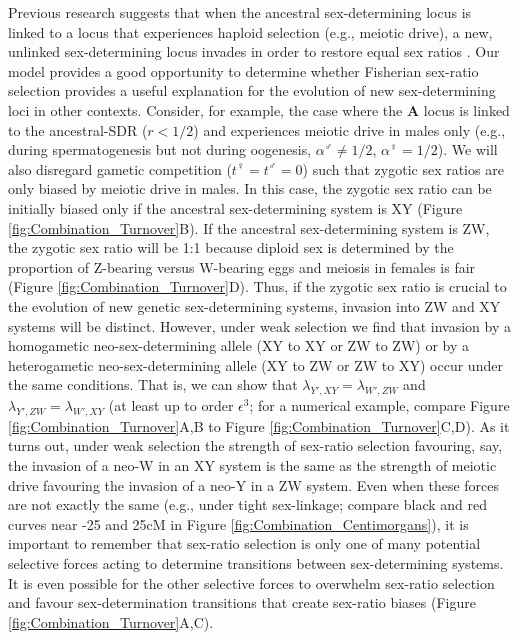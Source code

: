 \documentclass[12pt]{article}
\begin{document}
Previous research suggests that when the ancestral sex-determining locus is linked to a locus that experiences haploid selection (e.g., meiotic drive), a new, unlinked sex-determining locus invades in order to restore equal sex ratios \citep{Kozielska:2010vm}. 
Our model provides a good opportunity to determine whether Fisherian sex-ratio selection provides a useful explanation for the evolution of new sex-determining loci in other contexts. 
Consider, for example, the case where the \textbf{A} locus is linked to the ancestral-SDR ($r<1/2$) and experiences meiotic drive in males only (e.g., during spermatogenesis but not during oogenesis, $\alpha^\male \neq 1/2$, $\alpha^\female=1/2$). 
We will also disregard gametic competition ($t^\female=t^\male=0$) such that zygotic sex ratios are only biased by meiotic drive in males. 
In this case, the zygotic sex ratio can be initially biased only if the ancestral sex-determining system is XY (Figure \ref{fig:Combination_Turnover}B). 
If the ancestral sex-determining system is ZW, the zygotic sex ratio will be 1:1 because diploid sex is determined by the proportion of Z-bearing versus W-bearing eggs and meiosis in females is fair (Figure \ref{fig:Combination_Turnover}D).
Thus, if the zygotic sex ratio is crucial to the evolution of new genetic sex-determining systems, invasion into ZW and XY systems will be distinct. 
However, under weak selection we find that invasion by a homogametic neo-sex-determining allele (XY to XY or ZW to ZW) or by a heterogametic neo-sex-determining allele (XY to ZW or ZW to XY) occur under the same conditions. 
That is, we can show that $\lambda_{Y',XY}=\lambda_{W',ZW}$ and $\lambda_{Y',ZW}=\lambda_{W',XY}$ (at least up to order $\epsilon^3$; for a numerical example, compare Figure \ref{fig:Combination_Turnover}A,B to Figure \ref{fig:Combination_Turnover}C,D).
As it turns out, under weak selection the strength of sex-ratio selection favouring, say, the invasion of a neo-W in an XY system is the same as the strength of meiotic drive favouring the invasion of a neo-Y in a ZW system. 
Even when these forces are not exactly the same (e.g., under tight sex-linkage; compare black and red curves near -25 and 25cM in Figure \ref{fig:Combination_Centimorgans}), it is important to remember that sex-ratio selection is only one of many potential selective forces acting to determine transitions between sex-determining systems.
It is even possible for the other selective forces to overwhelm sex-ratio selection and favour sex-determination transitions that create sex-ratio biases (Figure \ref{fig:Combination_Turnover}A,C).
\end{document}
